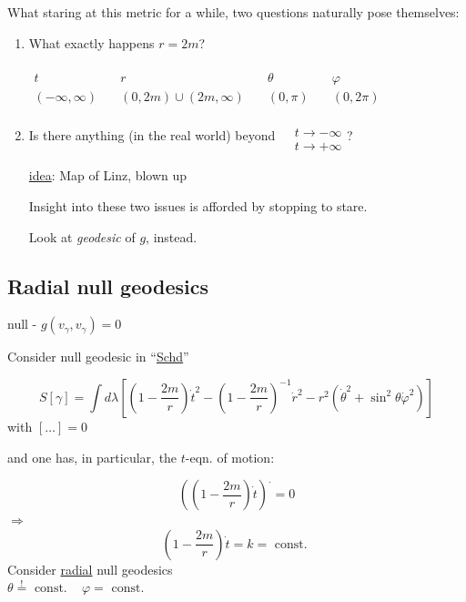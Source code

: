 	What staring at this metric for a while, two questions naturally pose themselves:
	
	\begin{enumerate}
		\item[(i)] What exactly happens \@ $r= 2m$?
		
		$\begin{aligned} & & & & \quad \\
		t \quad & r \quad & \theta \quad & \varphi \\ 
		(-\infty,\infty) \quad & (0,2m) \cup ( 2m, \infty) \quad & (0,\pi) \quad & (0,2\pi) \end{aligned}$
		
		
		\item[(ii)] Is there anything (in the real world) beyond $\begin{aligned} & \quad \\
		& t \to -\infty \\
		& t\to +\infty \end{aligned}$?
		
		\underline{idea}: Map of Linz, blown up
		
		Insight into these two issues is afforded by stopping to stare.  
		
		Look at \emph{geodesic} of $g$, instead.
		
	\end{enumerate}
	
	\subsection{Radial null geodesics}
	
	null - $g(v_{\gamma},v_{\gamma} ) = 0$
	
	Consider null geodesic in ``\underline{Schd}''
	
	\[
	S[\gamma ] = \int d\lambda \left[ \left( 1 - \frac{2m}{r} \right)\dot{t}^2 - \left(1 - \frac{2m}{r} \right)^{-1} \dot{r}^2 - r^2( \dot{\theta}^2 + \sin^2{\theta} \dot{\varphi}^2 ) \right]
	\]
	with $[\dots ] =0$
	
	and one has, in particular, the $t$-eqn. of motion:
	
	\[
	\left( \left( 1-  \frac{2m}{r} \right) \dot{t} \right)^{.} = 0
	\]
	$\Longrightarrow$
	\[
	\boxed{ \left( 1 - \frac{2m}{r} \right)\dot{t} = k } = \text{ const. }
	\]
	Consider \underline{radial} null geodesics \\
	$\theta \overset{!}{=} \text{ const. }$ \quad \quad \, $\varphi = \text{ const. }$
	
